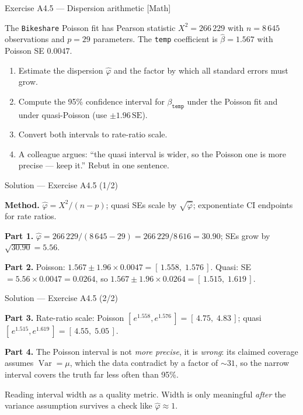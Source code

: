 \documentclass[aspectratio=169,11pt]{beamer}
\begin{document}
\begin{frame}{Exercise A4.5 --- Dispersion arithmetic [Math]}
\begin{exercise}
  The \texttt{Bikeshare} Poisson fit has Pearson statistic $X^2 = 266\,229$ with
  $n = 8\,645$ observations and $p = 29$ parameters. The \texttt{temp} coefficient is
  $\hat\beta = 1.567$ with Poisson SE $0.0047$.
  \begin{enumerate}
    \item Estimate the dispersion $\hat\varphi$ and the factor by which all standard
          errors must grow.
    \item Compute the 95\% confidence interval for $\beta_{\texttt{temp}}$ under the
          Poisson fit and under quasi-Poisson (use $\pm 1.96\,\text{SE}$).
    \item Convert both intervals to rate-ratio scale.
    \item A colleague argues: ``the quasi interval is wider, so the Poisson one is more
          precise --- keep it.'' Rebut in one sentence.
  \end{enumerate}
\end{exercise}
\end{frame}

\begin{frame}{Solution --- Exercise A4.5 (1/2)}
\begin{solutionbox}
  \textbf{Method.} $\hat\varphi = X^2/(n-p)$; quasi SEs scale by $\sqrt{\hat\varphi}$;
  exponentiate CI endpoints for rate ratios.

  \textbf{Part 1.} $\hat\varphi = 266\,229 / (8\,645 - 29) = 266\,229/8\,616 =
  \mathbf{30.90}$; SEs grow by $\sqrt{30.90} = \mathbf{5.56}$.

  \textbf{Part 2.} Poisson: $1.567 \pm 1.96 \times 0.0047 = [\,1.558,\; 1.576\,]$.
  Quasi: SE $= 5.56\times 0.0047 = 0.0264$, so
  $1.567 \pm 1.96\times 0.0264 = [\,1.515,\; 1.619\,]$.
\end{solutionbox}
\end{frame}

\begin{frame}{Solution --- Exercise A4.5 (2/2)}
\begin{solutionbox}
  \textbf{Part 3.} Rate-ratio scale: Poisson $[\,e^{1.558}, e^{1.576}\,] =
  [\,4.75,\; 4.83\,]$; quasi $[\,e^{1.515}, e^{1.619}\,] = [\,4.55,\; 5.05\,]$.

  \textbf{Part 4.} The Poisson interval is not \emph{more precise}, it is
  \emph{wrong}: its claimed coverage assumes $\operatorname{Var}=\mu$, which the data
  contradict by a factor of $\sim\!31$, so the narrow interval covers the truth far
  less often than 95\%.
\end{solutionbox}
\begin{mistake}
  Reading interval width as a quality metric. Width is only meaningful \emph{after} the
  variance assumption survives a check like $\hat\varphi \approx 1$.
\end{mistake}
\end{frame}
\end{document}
